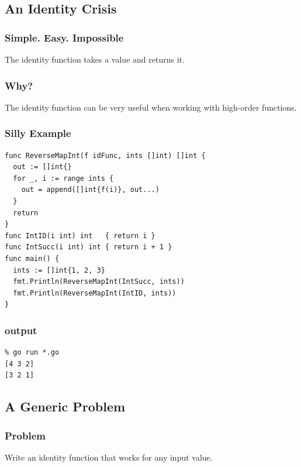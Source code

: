 \documentclass{beamer}
\begin{document}
\subsection{An Identity Crisis}
\begin{frame}
  \frametitle{Simple. Easy. Impossible}
  The identity function takes a value and returns it.
\end{frame}

\begin{frame}
  \frametitle{Why?}
  The identity function can be very useful when working with
  high-order functions.
\end{frame}

\begin{frame}[fragile]
  \frametitle{Silly Example}
\begin{lstlisting}[language=Golang]
% type idFunc = func(int)int
func ReverseMapInt(f idFunc, ints []int) []int {
  out := []int{}
  for _, i := range ints {
    out = append([]int{f(i)}, out...)
  }
  return
}
func IntID(i int) int   { return i }
func IntSucc(i int) int { return i + 1 }
func main() {
  ints := []int{1, 2, 3}
  fmt.Println(ReverseMapInt(IntSucc, ints))
  fmt.Println(ReverseMapInt(IntID, ints))
}
\end{lstlisting}
\end{frame}

\begin{frame}[fragile]
  \frametitle{output}
\begin{center}
\begin{lstlisting}
% go run *.go
[4 3 2]
[3 2 1]
\end{lstlisting}
  \end{center}
\end{frame}

\subsection{A Generic Problem}

\begin{frame}
  \frametitle{Problem}
  Write an identity function that works for any input value.
\end{frame}
\end{document}
